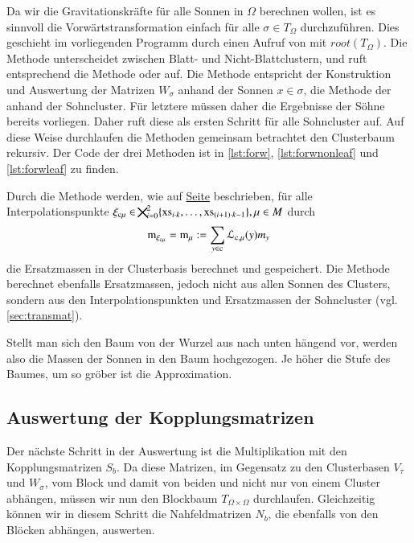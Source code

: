     Da wir die Gravitationskräfte für alle Sonnen in $\Omega$ berechnen wollen, ist es sinnvoll die Vorwärtstransformation einfach für alle $\sigma \in T_\Omega$ durchzuführen. Dies geschieht
    im vorliegenden Programm durch einen Aufruf von  mit $root(T_\Omega)$.
    Die Methode  unterscheidet zwischen Blatt- und Nicht-Blattclustern, und ruft entsprechend die Methode  oder 
    auf. Die Methode  entspricht der Konstruktion und Auswertung der Matrizen $W_\sigma$ anhand der Sonnen $x \in \sigma$, die Methode  
    der anhand der Sohncluster.
    Für letztere müssen daher die Ergebnisse der Söhne bereits vorliegen. Daher ruft diese als ersten Schritt  für alle Sohncluster  auf. Auf diese Weise durchlaufen die 
    Methoden gemeinsam betrachtet den Clusterbaum rekursiv. Der Code der drei Methoden ist in \autoref{lst:forw}, \autoref{lst:forwnonleaf} und \autoref{lst:forwleaf} zu finden.
    
    Durch die Methode  werden, wie auf \hyperref[w:ersatzmassen]{Seite} \pageref{w:ersatzmassen} beschrieben, für alle Interpolationspunkte 
    $\xi_{\tcode{c}\mu} \in \bigtimes_{i=0}^2 \{\tcode{xs}_{i \cdot k}, \dots ,\tcode{xs}_{(i+1) \cdot k-1}\}, \mu \in M$ durch
    \[
      \tcode{m}_{\xi_{\tcode{c}\mu}} = \tcode{m}_\mu := \sum_{y \in \tcode{c}} \lag_{\tcode{c},\mu}(y) m_y
    \]
    die Ersatzmassen in der Clusterbasis berechnet und gespeichert. Die Methode  berechnet ebenfalls Ersatzmassen, jedoch nicht aus allen Sonnen des Clusters,
    sondern aus den Interpolationspunkten und Ersatzmassen der Sohncluster (vgl. \autoref{sec:transmat}).
    
    Stellt man sich den Baum von der Wurzel aus nach unten hängend vor, werden also die Massen der Sonnen in den Baum hochgezogen. Je höher die Stufe des Baumes, um so gröber ist die Approximation.
    
    
    \subsection{Auswertung der Kopplungsmatrizen}
    Der nächste Schritt in der Auswertung ist die Multiplikation mit den Kopplungsmatrizen $S_b$. Da diese Matrizen, im Gegensatz zu den Clusterbasen $V_\tau$ und $W_\sigma$, vom Block und damit
    von beiden und nicht nur von einem Cluster abhängen, müssen wir nun den Blockbaum $T_{\Omega \times \Omega}$ durchlaufen. 
    Gleichzeitig können wir in diesem Schritt die Nahfeldmatrizen $N_b$, die ebenfalls von den Blöcken abhängen, auswerten. 
    
